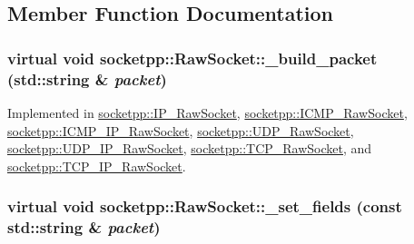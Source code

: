 \subsection{Member Function Documentation}
\hypertarget{classsocketpp_1_1RawSocket_eb0a3f716c0fc46efa4123acf0fe1e66}{
\subsubsection[{\_\-build\_\-packet}]{\setlength{\rightskip}{0pt plus 5cm}virtual void socketpp::RawSocket::\_\-build\_\-packet (std::string \& {\em packet})}}
\label{classsocketpp_1_1RawSocket_eb0a3f716c0fc46efa4123acf0fe1e66}




Implemented in \hyperlink{classsocketpp_1_1IP__RawSocket_6863cc399c543073e9aa3615c3f50940}{socketpp::IP\_\-RawSocket}, \hyperlink{classsocketpp_1_1ICMP__RawSocket_d8aa8d45c57eb77ab99ee84f1c5dd7da}{socketpp::ICMP\_\-RawSocket}, \hyperlink{classsocketpp_1_1ICMP__IP__RawSocket_49a62078d6febf7a11b9350de1e23903}{socketpp::ICMP\_\-IP\_\-RawSocket}, \hyperlink{classsocketpp_1_1UDP__RawSocket_fe8cc7391c23dcf011f285b1605cad6b}{socketpp::UDP\_\-RawSocket}, \hyperlink{classsocketpp_1_1UDP__IP__RawSocket_16035f1b701b898f0e4de44a9ac8bbb3}{socketpp::UDP\_\-IP\_\-RawSocket}, \hyperlink{classsocketpp_1_1TCP__RawSocket_d89a39d4bc91a76d0cb50da5cdd10fbc}{socketpp::TCP\_\-RawSocket}, and \hyperlink{classsocketpp_1_1TCP__IP__RawSocket_281508237add8a3c530bb0be0b6a1e7b}{socketpp::TCP\_\-IP\_\-RawSocket}.\hypertarget{classsocketpp_1_1RawSocket_45e6b041703cb8ae0f93dd19766865d5}{
\subsubsection[{\_\-set\_\-fields}]{\setlength{\rightskip}{0pt plus 5cm}virtual void socketpp::RawSocket::\_\-set\_\-fields (const std::string \& {\em packet})}}
\label{classsocketpp_1_1RawSocket_45e6b041703cb8ae0f93dd19766865d5}




